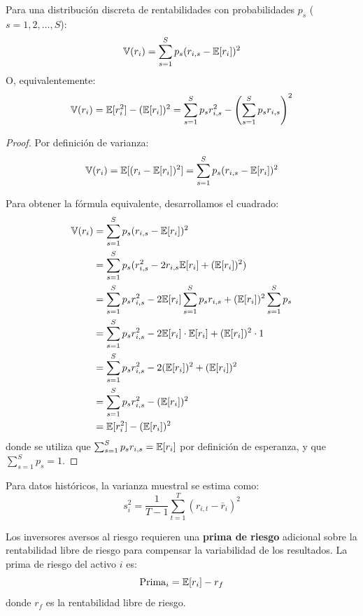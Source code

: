 \begin{teorema}
Para una distribución discreta de rentabilidades con probabilidades $p_s$ ($s = 1, 2, \ldots, S$):
\begin{equation}
\mathbb{V}(r_i) = \sum_{s=1}^{S} p_s (r_{i,s} - \mathbb{E}[r_i])^2
\end{equation}
O, equivalentemente:
\begin{equation}
\mathbb{V}(r_i) = \mathbb{E}[r_i^2] - (\mathbb{E}[r_i])^2 = \sum_{s=1}^{S} p_s r_{i,s}^2 - \left(\sum_{s=1}^{S} p_s r_{i,s}\right)^2
\end{equation}
\end{teorema}

\begin{proof}
Por definición de varianza:
$$\mathbb{V}(r_i) = \mathbb{E}[(r_i - \mathbb{E}[r_i])^2] = \sum_{s=1}^{S} p_s (r_{i,s} - \mathbb{E}[r_i])^2$$

Para obtener la fórmula equivalente, desarrollamos el cuadrado:
\begin{align*}
\mathbb{V}(r_i) &= \sum_{s=1}^{S} p_s (r_{i,s} - \mathbb{E}[r_i])^2 \\
&= \sum_{s=1}^{S} p_s (r_{i,s}^2 - 2r_{i,s}\mathbb{E}[r_i] + (\mathbb{E}[r_i])^2) \\
&= \sum_{s=1}^{S} p_s r_{i,s}^2 - 2\mathbb{E}[r_i]\sum_{s=1}^{S} p_s r_{i,s} + (\mathbb{E}[r_i])^2 \sum_{s=1}^{S} p_s \\
&= \sum_{s=1}^{S} p_s r_{i,s}^2 - 2\mathbb{E}[r_i] \cdot \mathbb{E}[r_i] + (\mathbb{E}[r_i])^2 \cdot 1 \\
&= \sum_{s=1}^{S} p_s r_{i,s}^2 - 2(\mathbb{E}[r_i])^2 + (\mathbb{E}[r_i])^2 \\
&= \sum_{s=1}^{S} p_s r_{i,s}^2 - (\mathbb{E}[r_i])^2 \\
&= \mathbb{E}[r_i^2] - (\mathbb{E}[r_i])^2
\end{align*}
donde se utiliza que $\sum_{s=1}^{S} p_s r_{i,s} = \mathbb{E}[r_i]$ por definición de esperanza, y que $\sum_{s=1}^{S} p_s = 1$.
\end{proof}

Para datos históricos, la varianza muestral se estima como:
\begin{equation}
s_i^2 = \frac{1}{T-1} \sum_{t=1}^{T} (r_{i,t} - \bar{r}_i)^2
\end{equation}

\begin{proposicion}
Los inversores aversos al riesgo requieren una \textbf{prima de riesgo} adicional sobre la rentabilidad libre de riesgo para compensar la variabilidad de los resultados. La prima de riesgo del activo $i$ es:
\begin{equation}
\text{Prima}_i = \mathbb{E}[r_i] - r_f
\end{equation}
donde $r_f$ es la rentabilidad libre de riesgo.
\end{proposicion}

